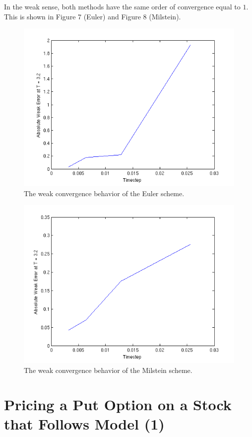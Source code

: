 \documentclass[11pt]{report}
\begin{document}
In the weak sense, both methods have the same order of convergence equal to $1$.  This is shown in Figure 7 (Euler) and Figure 8 (Milstein).
 \begin{figure}[h]
 \includegraphics{Figures/euler_weak.png}
 \caption{The weak convergence behavior of the Euler scheme.}
\end{figure}
\clearpage

 \begin{figure}[h]
 \includegraphics{Figures/milstein_weak.png}
 \caption{The weak convergence behavior of the Milstein scheme.}
\end{figure}
\clearpage

\section{Pricing a Put Option on a Stock that Follows Model (1)}
\end{document}
